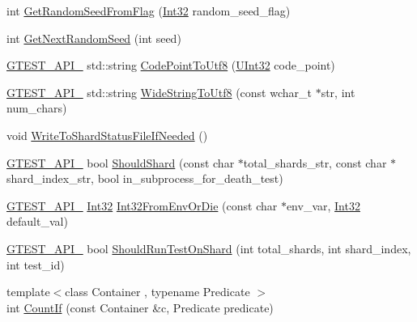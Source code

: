 \begin{DoxyCompactItemize}
\item 
int \hyperlink{namespacetesting_1_1internal_ae74fedbdaebaac8d1202192266243b9e}{Get\+Random\+Seed\+From\+Flag} (\hyperlink{namespacetesting_1_1internal_a8ee38faaf875f133358abaf9bc056cec}{Int32} random\+\_\+seed\+\_\+flag)
\item 
int \hyperlink{namespacetesting_1_1internal_a6e07a655cb987d131cd8fbeba9a7f1eb}{Get\+Next\+Random\+Seed} (int seed)
\item 
\hyperlink{gtest-port_8h_aa73be6f0ba4a7456180a94904ce17790}{G\+T\+E\+S\+T\+\_\+\+A\+P\+I\+\_\+} std\+::string \hyperlink{namespacetesting_1_1internal_a0c0f9558efb9abb965851c4738cdc725}{Code\+Point\+To\+Utf8} (\hyperlink{namespacetesting_1_1internal_a40d4fffcd2bf56f18b1c380615aa85e3}{U\+Int32} code\+\_\+point)
\item 
\hyperlink{gtest-port_8h_aa73be6f0ba4a7456180a94904ce17790}{G\+T\+E\+S\+T\+\_\+\+A\+P\+I\+\_\+} std\+::string \hyperlink{namespacetesting_1_1internal_a05b8c86ff38243f34d8f839a0eadefb1}{Wide\+String\+To\+Utf8} (const wchar\+\_\+t $\ast$str, int num\+\_\+chars)
\item 
void \hyperlink{namespacetesting_1_1internal_a19b35b39782d41e6ef76e1910a3a502e}{Write\+To\+Shard\+Status\+File\+If\+Needed} ()
\item 
\hyperlink{gtest-port_8h_aa73be6f0ba4a7456180a94904ce17790}{G\+T\+E\+S\+T\+\_\+\+A\+P\+I\+\_\+} bool \hyperlink{namespacetesting_1_1internal_a0fe41657b1d1ab7ec4e37ec07403ee6c}{Should\+Shard} (const char $\ast$total\+\_\+shards\+\_\+str, const char $\ast$shard\+\_\+index\+\_\+str, bool in\+\_\+subprocess\+\_\+for\+\_\+death\+\_\+test)
\item 
\hyperlink{gtest-port_8h_aa73be6f0ba4a7456180a94904ce17790}{G\+T\+E\+S\+T\+\_\+\+A\+P\+I\+\_\+} \hyperlink{namespacetesting_1_1internal_a8ee38faaf875f133358abaf9bc056cec}{Int32} \hyperlink{namespacetesting_1_1internal_aaa576613655c2f380278c255c3ec5fef}{Int32\+From\+Env\+Or\+Die} (const char $\ast$env\+\_\+var, \hyperlink{namespacetesting_1_1internal_a8ee38faaf875f133358abaf9bc056cec}{Int32} default\+\_\+val)
\item 
\hyperlink{gtest-port_8h_aa73be6f0ba4a7456180a94904ce17790}{G\+T\+E\+S\+T\+\_\+\+A\+P\+I\+\_\+} bool \hyperlink{namespacetesting_1_1internal_a437bd89f5bc532778d7467600e210395}{Should\+Run\+Test\+On\+Shard} (int total\+\_\+shards, int shard\+\_\+index, int test\+\_\+id)
\item 
{\footnotesize template$<$class Container , typename Predicate $>$ }\\int \hyperlink{namespacetesting_1_1internal_a1e77a774d910346eff11a86d8df783a5}{Count\+If} (const Container \&c, Predicate predicate)

\end{DoxyCompactItemize}
